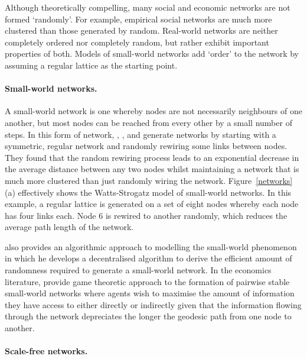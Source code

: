 Although theoretically compelling, many social and economic networks are not formed `randomly'. For example, empirical social networks are much more clustered than those generated by random. Real-world networks are neither completely ordered nor completely random, but rather exhibit important properties of both. Models of small-world networks add `order' to the network by assuming a regular lattice as the starting point.

\paragraph{Small-world networks.}

A small-world network is one whereby nodes are not necessarily neighbours of one another, but most nodes can be reached from every other by a small number of steps. In this form of network, \citet{WattsStrogatz1998}, \citet{Watts1999}, and \citet{NewmanStrogatzWatts2001} generate networks by starting with a symmetric, regular network and randomly rewiring some links between nodes. They found that the random rewiring process leads to an exponential decrease in the average distance between any two nodes whilst maintaining a network that is much more clustered than just randomly wiring the network. Figure~\ref{networks} (a) effectively shows the Watts-Strogatz model of small-world networks. In this example, a regular lattice is generated on a set of eight nodes whereby each node has four links each. Node 6 is rewired to another randomly, which reduces the average path length of the network.

\citet{Kleinberg2000a, Kleinberg2000b} also provides an algorithmic approach to modelling the small-world phenomenon in which he develops a decentralised algorithm to derive the efficient amount of randomness required to generate a small-world network. In the economics literature, \citet{JacksonRogers2005} provide game theoretic approach to the formation of pairwise stable small-world networks where agents wish to maximise the amount of information they have access to either directly or indirectly given that the information flowing through the network depreciates the longer the geodesic path from one node to another.

\paragraph{Scale-free networks.}

